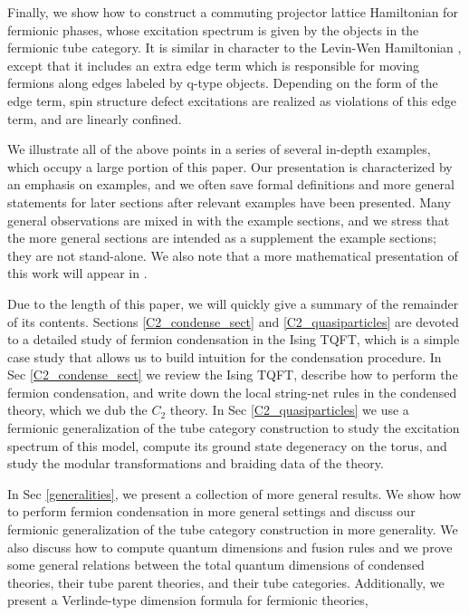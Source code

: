 \documentclass[12pt,a4paper]{article}
\newcommand{\dave}[1]{{\color{ao(english)}\footnotesize{(DA) #1}}}
\newcommand{\ethan}[1]{{\color{amethyst}\footnotesize{(EL) #1}}}
\begin{document}
Finally, we show how to construct a commuting projector lattice Hamiltonian 
for fermionic phases, whose excitation spectrum is given by the objects in the fermionic tube category.  
It is similar in character to the Levin-Wen Hamiltonian \cite{levin2005}, 
except that it includes an extra edge term which is responsible for moving fermions along
edges labeled by q-type objects. 
Depending on the form of the edge term, spin structure defect excitations 
are realized as violations of this edge term, and are linearly confined. 

We illustrate all of the above points in a series of several in-depth examples, which occupy a large portion 
of this paper.
Our presentation is characterized by an emphasis on examples, 
and we often save formal definitions and more general statements 
for later sections after relevant examples have been presented.  
Many general observations are mixed in with the example sections,
and we stress that the more general sections are intended as a supplement
the example sections; they are not stand-alone.
We also note that a more mathematical presentation of this work will appear in \cite{Kevin and scott's paper?}. 


Due to the length of this paper, we will quickly give a summary of the remainder of its contents.
Sections \ref{C2_condense_sect} and \ref{C2_quasiparticles} are devoted to a detailed study of 
fermion condensation in the Ising TQFT, which is a simple case study that allows us to build intuition for the condensation procedure.
In Sec \ref{C2_condense_sect} we review the Ising TQFT, describe how to perform the 
fermion condensation, and write down the local string-net rules in the condensed theory, 
which we dub the $C_2$ theory. 
In Sec \ref{C2_quasiparticles} we use a fermionic generalization of the tube category 
construction to study the excitation spectrum of this model, compute its ground state 
degeneracy on the torus, and study the modular transformations and braiding data of 
the theory. 

In Sec \ref{generalities}, we present a collection of more general results. 
We show how to perform fermion condensation in more general settings
and discuss our fermionic generalization 
of the tube category construction in more generality.
We also discuss how to compute quantum dimensions and fusion rules
and we prove some general
relations between the total quantum dimensions of condensed theories, their 
tube parent theories, and their tube categories.
Additionally, we present a Verlinde-type
dimension formula for fermionic theories,
\end{document}
